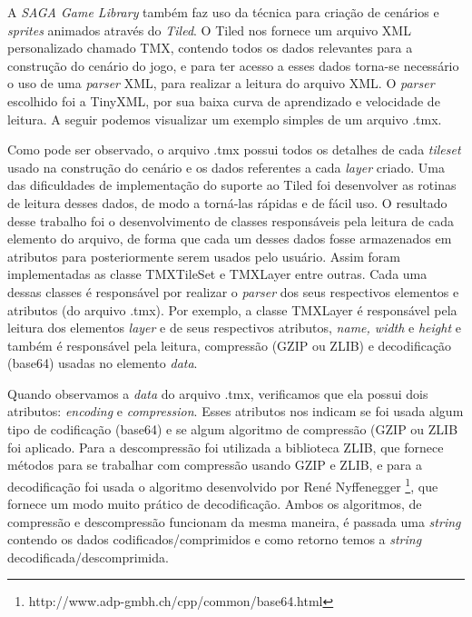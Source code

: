 %
%
%
%
\par 
A \textit{SAGA Game Library} também faz uso da técnica para criação de cenários e \textit{sprites} animados através do \textit{Tiled}. O Tiled nos fornece um arquivo XML personalizado chamado TMX, contendo todos os dados relevantes para a construção do cenário do jogo, e para ter acesso a esses dados torna-se necessário o uso de uma \textit{parser} XML, para realizar a leitura do arquivo XML. O \textit{parser} escolhido foi a TinyXML, por sua baixa curva de aprendizado e velocidade de leitura. A seguir podemos visualizar um exemplo simples de um arquivo .tmx.
%
%

%
\par 
Como pode ser observado, o arquivo .tmx possui todos os detalhes de cada \textit{tileset} usado na construção do cenário e os dados referentes a cada \textit{layer} criado. Uma das dificuldades de implementação do suporte ao Tiled foi desenvolver as rotinas de leitura desses dados, de modo a torná-las rápidas e de fácil uso. O resultado desse trabalho foi o desenvolvimento de classes responsáveis pela leitura de cada elemento do arquivo, de forma que cada um desses dados fosse armazenados em atributos para posteriormente serem usados pelo usuário. Assim foram implementadas as classe TMXTileSet e TMXLayer entre outras. Cada uma dessas classes é responsável por realizar o \textit{parser} dos seus respectivos elementos e atributos (do arquivo .tmx). Por exemplo, a classe TMXLayer é responsável pela leitura dos elementos \textit{layer} e de seus respectivos atributos, \textit{name, width} e \textit{height} e também é responsável pela leitura, compressão (GZIP ou ZLIB) e decodificação (base64) usadas no elemento \textit{data}.
%
\par 
Quando observamos a \textit{data} do arquivo .tmx, verificamos que ela possui dois atributos: \textit{encoding} e \textit{compression}. Esses atributos nos indicam se foi usada algum tipo de codificação (base64) e se algum algoritmo de compressão (GZIP ou ZLIB foi aplicado. Para a descompressão foi utilizada a biblioteca ZLIB, que fornece métodos para se trabalhar com compressão usando GZIP e ZLIB, e para a decodificação foi usada o algoritmo desenvolvido por René Nyffenegger \footnote{http://www.adp-gmbh.ch/cpp/common/base64.html}, que fornece um modo muito prático de decodificação. Ambos os algoritmos, de compressão e descompressão funcionam da mesma maneira, é passada uma \textit{string} contendo os dados codificados/comprimidos e como retorno temos a \textit{string} decodificada/descomprimida. 

